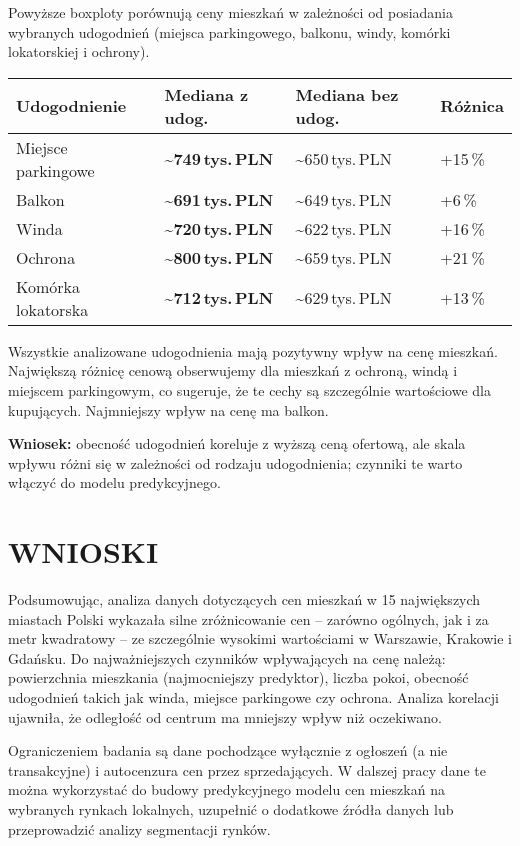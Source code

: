 \documentclass[11pt]{article}
\begin{document}
Powyższe boxploty porównują ceny mieszkań w zależności od posiadania
wybranych udogodnień (miejsca parkingowego, balkonu, windy, komórki
lokatorskiej i ochrony).

\begin{longtable}[]{@{}llll@{}}
\toprule\noalign{}
Udogodnienie & Mediana z udog. & Mediana bez udog. & Różnica \\
\midrule\noalign{}
\endhead
\bottomrule\noalign{}
\endlastfoot
Miejsce parkingowe & \textbf{\textasciitilde749\,tys.\,PLN} &
\textasciitilde650\,tys.\,PLN & +15\,\% \\
Balkon & \textbf{\textasciitilde691\,tys.\,PLN} &
\textasciitilde649\,tys.\,PLN & +6\,\% \\
Winda & \textbf{\textasciitilde720\,tys.\,PLN} &
\textasciitilde622\,tys.\,PLN & +16\,\% \\
Ochrona & \textbf{\textasciitilde800\,tys.\,PLN} &
\textasciitilde659\,tys.\,PLN & +21\,\% \\
Komórka lokatorska & \textbf{\textasciitilde712\,tys.\,PLN} &
\textasciitilde629\,tys.\,PLN & +13\,\% \\
\end{longtable}

Wszystkie analizowane udogodnienia mają pozytywny wpływ na cenę
mieszkań. Największą różnicę cenową obserwujemy dla mieszkań z ochroną,
windą i miejscem parkingowym, co sugeruje, że te cechy są szczególnie
wartościowe dla kupujących. Najmniejszy wpływ na cenę ma balkon.

\textbf{Wniosek:} obecność udogodnień koreluje z wyższą ceną ofertową,
ale skala wpływu różni się w zależności od rodzaju udogodnienia;
czynniki te warto włączyć do modelu predykcyjnego.

    \section{WNIOSKI}\label{wnioski}

    Podsumowując, analiza danych dotyczących cen mieszkań w 15 największych
miastach Polski wykazała silne zróżnicowanie cen -- zarówno ogólnych,
jak i za metr kwadratowy -- ze szczególnie wysokimi wartościami w
Warszawie, Krakowie i Gdańsku. Do najważniejszych czynników wpływających
na cenę należą: powierzchnia mieszkania (najmocniejszy predyktor),
liczba pokoi, obecność udogodnień takich jak winda, miejsce parkingowe
czy ochrona. Analiza korelacji ujawniła, że odległość od centrum ma
mniejszy wpływ niż oczekiwano.

Ograniczeniem badania są dane pochodzące wyłącznie z ogłoszeń (a nie
transakcyjne) i autocenzura cen przez sprzedających. W dalszej pracy
dane te można wykorzystać do budowy predykcyjnego modelu cen mieszkań na
wybranych rynkach lokalnych, uzupełnić o dodatkowe źródła danych lub
przeprowadzić analizy segmentacji rynków.


    
    
    
\end{document}
